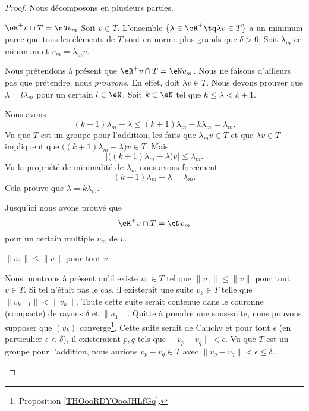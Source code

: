 \begin{proof}
    Nous décomposons en plusieurs parties.

    \begin{subproof}
        \item[\( \eR^+v\cap T=\eN v_m\)]
            Soit \( v\in T\). L'ensemble \( \{ \lambda \in \eR^+\tq \lambda v\in T\}\) a un minimum parce que tous les éléments de \( T\) sont en norme plus grands que \( \delta>0\). Soit \( \lambda_m\) ce minimum et \( v_m=\lambda_mv\).

            Nous prétendons à présent que \( \eR^+v\cap T=\eN v_m\). Nous ne faisons d'ailleurs pas que prétendre; nous \emph{prouvons}. En effet, doit \( \lambda v\in T\). Nous devons prouver que \( \lambda = l\lambda_m\) pour un certain \( l\in \eN\). Soit \( k\in \eN\) tel que \( k\leq \lambda<k+1\).

            Nous avons
            \begin{equation}
                (k+1)\lambda_m-\lambda\leq (k+1)\lambda_m-k\lambda_m=\lambda_m.
            \end{equation}
            Vu que \( T\) est un groupe pour l'addition, les faits que \( \lambda_mv\in T\) et que \( \lambda v\in T\) impliquent que \( \big( (k+1)\lambda_m-\lambda \big)v\in T\). Mais
            \begin{equation}
                | \big( (k+1)\lambda_m-\lambda \big)v |\leq \lambda_m.
            \end{equation}
            Vu la propriété de minimalité de \( \lambda_m\) nous avons forcément
            \begin{equation}
                (k+1)\lambda_m-\lambda = \lambda_m.
            \end{equation}
            Cela prouve que \( \lambda=k\lambda_m\). 
            
            Jusqu'ici nous avons prouvé que
            \begin{equation}
                \eR^+v\cap T=\eN v_m
            \end{equation}
            pour un certain multiple \( v_m\) de \( v\).

        \item[\( \| u_1 \|\leq \| v \|\) pour tout \( v\)]

            Nous montrons à présent qu'il existe \( u_1\in T\) tel que \( \| u_1 \|\leq \| v \|\) pour tout \( v\in T\). Si tel n'était pas le cas, il existerait une suite \( v_k\in T\) telle que \( \| v_{k+1} \|<\| v_k \|\). Toute cette suite serait contenue dans le couronne (compacte) de rayons \( \delta\) et \( \| u_1 \|\). Quitte à prendre une sous-suite, nous pouvons supposer que \( (v_k)\) converge\footnote{Proposition \ref{THOooRDYOooJHLfGq}.}. Cette suite serait de Cauchy et pour tout \( \epsilon\) (en particulier \( \epsilon<\delta\)), il existeraient \( p,q\) tels que \( \| v_p-v_q \|<\epsilon\). Vu que \( T\) est un groupe pour l'addition, nous aurions \( v_p-v_q\in T\) avec \( \| v_p-v_q \|<\epsilon\leq \delta\).


\end{subproof}
\end{proof}
